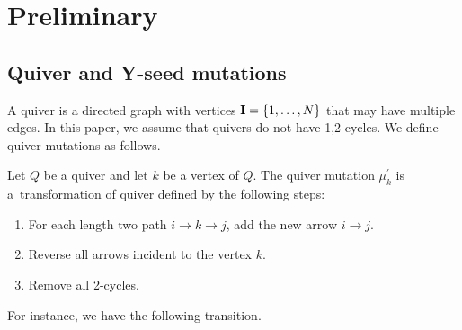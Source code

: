 \documentclass[10pt,a4paper]{amsart}
\numberwithin{equation}{section}
\begin{document}
	\section{Preliminary}

	\subsection{Quiver and Y-seed mutations}
A quiver is a directed graph with vertices ${\bf I}=\{1,\dots,N\}$ that may have multiple edges.
In this paper, we assume that quivers do not have 1,2-cycles.
We define quiver mutations as follows.
		\begin{Definition}
		Let $Q$ be a quiver and let $k$ be a vertex of $Q$.
		The quiver mutation $\mu_k^\prime$ is a~transformation of quiver defined by the following steps:
			\begin{enumerate}\itemsep=0pt
			\item For each length two path $i\rightarrow k\rightarrow j$, add the new arrow $i\rightarrow j$.
			\item Reverse all arrows incident to the vertex $k$.
			\item Remove all 2-cycles.
			\end{enumerate}
		\end{Definition}
For instance, we have the following transition.
\end{document}
